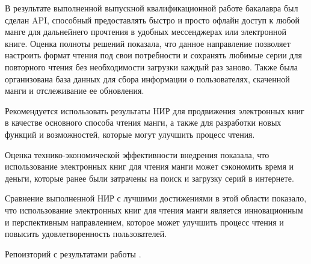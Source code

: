 \conclusion

В результате выполненной выпускной квалификационной работе бакалавра был сделан API, способный предоставлять быстро и просто офлайн доступ к любой манге для дальнейнего прочтения в удобных мессенджерах или электронной книге.
Оценка полноты решений показала, что данное направление позволяет настроить формат чтения под свои потребности и сохранять любимые серии для повторного чтения без необходимости загрузки каждый раз заново.
Также была организована база данных для сбора информации о пользователях, скаченной манги и отслеживание ее обновления.

Рекомендуется использовать результаты НИР для продвижения электронных книг в качестве основного способа чтения манги, 
а также для разработки новых функций и возможностей, которые могут улучшить процесс чтения.

Оценка технико-экономической эффективности внедрения показала, что использование электронных книг для чтения манги может сэкономить время и деньги, 
которые ранее были затрачены на поиск и загрузку серий в интернете.

Сравнение выполненной НИР с лучшими достижениями в этой области показало, 
что использование электронных книг для чтения манги является инновационным и перспективным направлением, 
которое может улучшить процесс чтения и повысить удовлетворенность пользователей.

Репоизторий с результатами работы \cite{result-cite}.